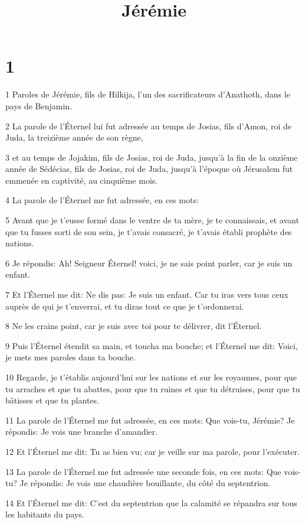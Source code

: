 

\title{Jérémie}


\chapter{1}

\par 1 Paroles de Jérémie, fils de Hilkija, l'un des sacrificateurs d'Anathoth, dans le pays de Benjamin.
\par 2 La parole de l'Éternel lui fut adressée au temps de Josias, fils d'Amon, roi de Juda, la treizième année de son règne,
\par 3 et au temps de Jojakim, fils de Josias, roi de Juda, jusqu'à la fin de la onzième année de Sédécias, fils de Josias, roi de Juda, jusqu'à l'époque où Jérusalem fut emmenée en captivité, au cinquième mois.
\par 4 La parole de l'Éternel me fut adressée, en ces mots:
\par 5 Avant que je t'eusse formé dans le ventre de ta mère, je te connaissais, et avant que tu fusses sorti de son sein, je t'avais consacré, je t'avais établi prophète des nations.
\par 6 Je répondis: Ah! Seigneur Éternel! voici, je ne sais point parler, car je suis un enfant.
\par 7 Et l'Éternel me dit: Ne dis pas: Je suis un enfant. Car tu iras vers tous ceux auprès de qui je t'enverrai, et tu diras tout ce que je t'ordonnerai.
\par 8 Ne les crains point, car je suis avec toi pour te délivrer, dit l'Éternel.
\par 9 Puis l'Éternel étendit sa main, et toucha ma bouche; et l'Éternel me dit: Voici, je mets mes paroles dans ta bouche.
\par 10 Regarde, je t'établis aujourd'hui sur les nations et sur les royaumes, pour que tu arraches et que tu abattes, pour que tu ruines et que tu détruises, pour que tu bâtisses et que tu plantes.
\par 11 La parole de l'Éternel me fut adressée, en ces mots: Que vois-tu, Jérémie? Je répondis: Je vois une branche d'amandier.
\par 12 Et l'Éternel me dit: Tu as bien vu; car je veille sur ma parole, pour l'exécuter.
\par 13 La parole de l'Éternel me fut adressée une seconde fois, en ces mots: Que vois-tu? Je répondis: Je vois une chaudière bouillante, du côté du septentrion.
\par 14 Et l'Éternel me dit: C'est du septentrion que la calamité se répandra sur tous les habitants du pays.
